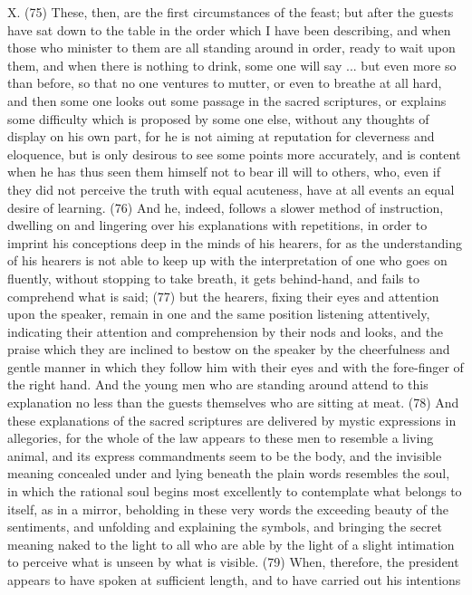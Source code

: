 X. (75) These, then, are the first circumstances of the feast; but after the guests have sat down to
the table in the order which I have been describing, and when those who minister to them are all
standing around in order, ready to wait upon them, and when there is nothing to drink, some one will
say ... but even more so than before, so that no one ventures to mutter, or even to breathe at all
hard, and then some one looks out some passage in the sacred scriptures, or explains some
difficulty which is proposed by some one else, without any thoughts of display on his own part, for
he is not aiming at reputation for cleverness and eloquence, but is only desirous to see some
points more accurately, and is content when he has thus seen them himself not to bear ill will to
others, who, even if they did not perceive the truth with equal acuteness, have at all events an
equal desire of learning. (76) And he, indeed, follows a slower method of instruction, dwelling on
and lingering over his explanations with repetitions, in order to imprint his conceptions deep in the
minds of his hearers, for as the understanding of his hearers is not able to keep up with the
interpretation of one who goes on fluently, without stopping to take breath, it gets behind-hand, and
fails to comprehend what is said; (77) but the hearers, fixing their eyes and attention upon the
speaker, remain in one and the same position listening attentively, indicating their attention and
comprehension by their nods and looks, and the praise which they are inclined to bestow on the
speaker by the cheerfulness and gentle manner in which they follow him with their eyes and with the
fore-finger of the right hand. And the young men who are standing around attend to this explanation
no less than the guests themselves who are sitting at meat. (78) And these explanations of the
sacred scriptures are delivered by mystic expressions in allegories, for the whole of the law
appears to these men to resemble a living animal, and its express commandments seem to be the
body, and the invisible meaning concealed under and lying beneath the plain words resembles the
soul, in which the rational soul begins most excellently to contemplate what belongs to itself, as in a
mirror, beholding in these very words the exceeding beauty of the sentiments, and unfolding and
explaining the symbols, and bringing the secret meaning naked to the light to all who are able by the
light of a slight intimation to perceive what is unseen by what is visible. (79) When, therefore, the
president appears to have spoken at sufficient length, and to have carried out his intentions

